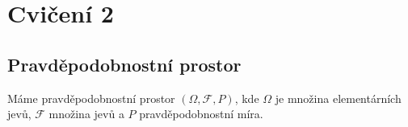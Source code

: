 \chapter{Cvičení 2}
\section{Pravděpodobnostní prostor}
Máme pravděpodobnostní prostor $(\Omega,\mathscr{F},P)$, kde $\Omega$ je množina elementárních jevů, $\mathscr{F}$ množina jevů a $P$ pravděpodobnostní míra. 